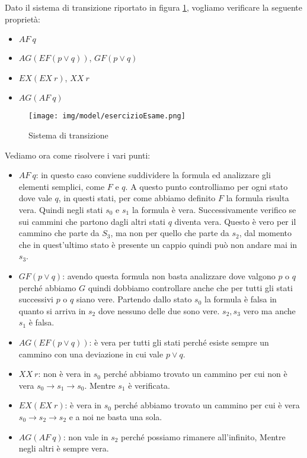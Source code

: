 \begin{esempio} 
    Dato il sistema di transizione riportato in figura \ref{fig:esercizioEsame},
    vogliamo verificare la seguente proprietà:
    \begin{itemize}
        \item $AF \ q$
        \item $AG (EF (p \lor q))$, $GF(p \lor q)$
        \item $EX (EX \ r)$, $XX \ r$
        \item $AG (AF \ q)$
    \end{itemize}
    \begin{figure}[!ht]
        \centering
        \texttt{[image: img/model/esercizioEsame.png]}
        \caption{Sistema di transizione}
        \label{fig:esercizioEsame}
    \end{figure}
    Vediamo ora come risolvere i vari punti:
    \begin{itemize}
        \item $AF \ q$: in questo caso conviene suddividere la formula ed
              analizzare gli elementi semplici, come $F$ e $q$. A questo punto
              controlliamo per ogni stato dove vale $q$, in questi stati, per
              come abbiamo definito $F$ la formula risulta vera. Quindi negli
              stati $s_0$ e $s_1$ la formula è vera. Successivamente verifico se
              sui cammini che partono dagli altri stati $q$ diventa vera. Questo
              è vero per il cammino che parte da $S_3$, ma non per quello che parte
              da $s_2$, dal momento che in quest'ultimo stato è presente un
              cappio quindi può non andare mai in $s_3$.
        \item $GF(p \lor q)$: avendo questa formula non basta analizzare dove
              valgono $p$ o $q$ perché abbiamo $G$ quindi dobbiamo controllare
              anche che per tutti gli stati successivi $p$ o $q$ siano vere.
              Partendo dallo stato $s_0$ la formula è falsa in quanto si arriva
              in $s_2$ dove nessuno delle due sono vere. $s_2,s_3$ vero ma anche
              $s_1$ è falsa. %
        \item $AG (EF (p \lor q))$: è vera per tutti gli stati perché esiste
              sempre un cammino con una deviazione in cui vale $p \lor q$.
        \item $XX \ r$: non è vera in $s_0$ perché abbiamo trovato un cammino
              per cui non è vera $s_0\to s_1\to s_0$. Mentre $s_1$ è verificata.
        \item $EX (EX \ r)$: è vera in $s_0$ perché abbiamo trovato un cammino
              per cui è vera $s_0\to s_2\to s_2$ e a noi ne basta una sola.
        \item $AG (AF \ q)$: non vale in $s_2$ perché possiamo rimanere
              all'infinito, Mentre negli altri è sempre vera.
    \end{itemize}
\end{esempio}
